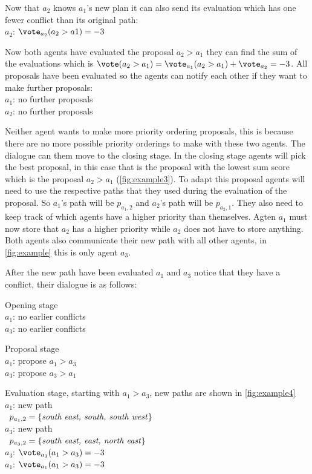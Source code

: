 Now that $a_2$ knows $a_1$'s new plan it can also send its evaluation which has 
one fewer conflict than its original path:
\\ \-\qquad $a_2$: $\vote_{a_2}(a_2 > a1) = -3$

Now both agents have evaluated the proposal $a_2 > a_1$ they can find the sum 
of the evaluations which is $\vote(a_2 > a_1) = \vote_{a_1}(a_2 > a_1) + 
\vote_{a_2} = -3$. All proposals have been evaluated so the agents can notify 
each other if they want to make further proposals:
\\ \-\quad $a_1$: no further proposals
\\ \-\quad $a_2$: no further proposals

Neither agent wants to make more priority ordering proposals, this is because 
there are no more possible priority orderings to make with these two agents. 
The dialogue can them move to the closing stage. In the closing stage agents 
will pick the best proposal, in this case that is the proposal with the lowest 
sum score which is the proposal $a_2 > a_1$ (\autoref{fig:example3}). To adapt 
this proposal agents will need to use the respective paths that they used 
during the evaluation of the proposal. So $a_1$'s path will be $p_{a_1,2}$ and 
$a_2$'s path will be $p_{a_2,1}$. They also need to keep track of which agents 
have a higher priority than themselves. Agten $a_1$ must now store that $a_2$ 
has a higher priority while $a_2$ does not have to store anything. Both agents 
also communicate their new path with all other agents, in \autoref{fig:example} 
this is only agent $a_3$.

After the new path have been evaluated $a_1$ and $a_3$ notice that they have a 
conflict, their dialogue is as follows:

Opening stage
\\ \-\qquad $a_1$: no earlier conflicts
\\ \-\qquad $a_3$: no earlier conflicts

Proposal stage
\\ \-\qquad $a_1$: propose $a_1 > a_3$
\\ \-\qquad $a_3$: propose $a_3 > a_1$

Evaluation stage, starting with $a_1 > a_3$, new paths are shown in 
\autoref{fig:example4}
\\ \-\qquad $a_1$: new path
\\ \-\qquad\quad\,\; $p_{a_1,2} = \{\text{\emph{south east, south, south 
west}}\}$
\\ \-\qquad $a_3$: new path
\\ \-\qquad\quad\,\; $p_{a_3,2} = \{\text{\emph{south east, east, north 
east}}\}$
\\ \-\qquad $a_3$: $\vote_{a_3}(a_1 > a_3) = -3$
\\ \-\qquad $a_1$: $\vote_{a_1}(a_1 > a_3) = -3$

